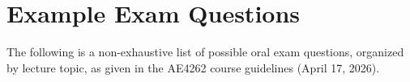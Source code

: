 \section{Example Exam Questions}

\noindent The following is a non-exhaustive list of possible oral exam questions, organized by lecture topic, as given in the AE4262 course guidelines (April 17, 2026).











